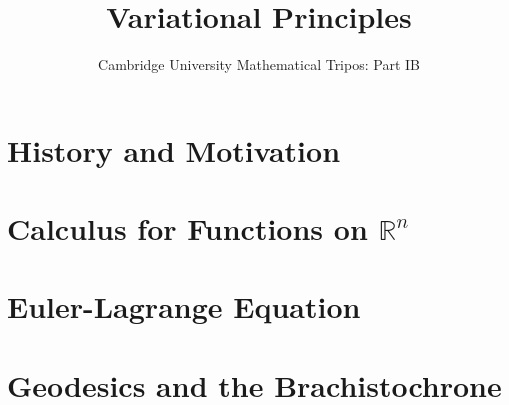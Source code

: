 \documentclass{article}
\title{Variational Principles}
\author{Cambridge University Mathematical Tripos: Part IB}
\begin{document}
\maketitle

\tableofcontentsnewpage{}

\section{History and Motivation}

\section{Calculus for Functions on \(\mathbb R^n\)}

\section{Euler-Lagrange Equation}

\section{Geodesics and the Brachistochrone}

\end{document}
